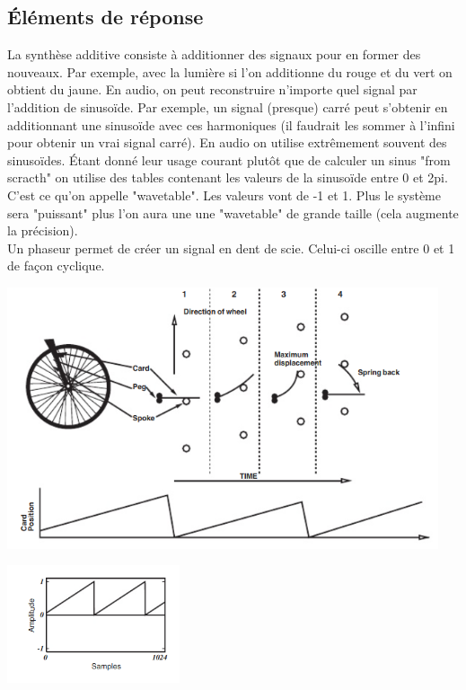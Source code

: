 \documentclass[letterpaper, 12pt]{article}
\newcommand{\alinea}{
\hspace*{0.5cm}}
\begin{document}
		\subsection{\'Eléments de réponse}
			\alinea  La synthèse additive consiste à additionner des signaux pour en former des nouveaux. 
				Par exemple, avec la lumière si l'on additionne du rouge et du vert on obtient du jaune.
				En audio, on peut reconstruire n'importe quel signal par l'addition de sinusoïde. Par exemple, 
				un signal (presque) carré peut s'obtenir en additionnant une sinusoïde avec ces harmoniques (il faudrait les sommer
				à l'infini pour obtenir un vrai signal carré). En audio on utilise extrêmement souvent des sinusoïdes. 
				Étant donné leur usage courant plutôt que de calculer un sinus "from scracth" on utilise des tables contenant 
				les valeurs de la sinusoïde entre 0 et 2pi. C'est ce qu'on appelle "wavetable". Les valeurs vont de -1 et 1.
				Plus le système sera "puissant" plus l'on aura une une "wavetable" de grande taille (cela augmente la précision).
			~\\
		    \alinea Un phaseur permet de créer un signal en dent de scie. Celui-ci oscille entre 0 et 1 de façon cyclique.
		    \begin{center}
		    	\includegraphics[width=5in]{Images/phasor}
		    \end{center}
		    \begin{center}
		    	\includegraphics[width=2in]{Images/phasor-signal}
		    \end{center}
\end{document}
